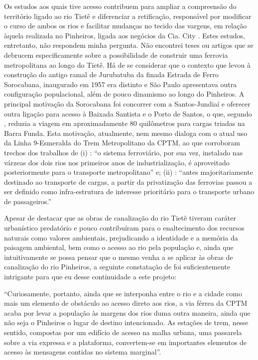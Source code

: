 \documentclass[
	12pt,				%
	openright,			%
	oneside,
	a4paper,			%
	english,			%
	french,				%
	spanish,			%
	brazil,				%
	]{abntex2}
\begin{document}
Os estudos aos quais tive acesso contribuem para ampliar a compreensão do território ligado ao rio Tietê e diferenciar a retificação, responsável por modificar o curso de ambos os rios e facilitar mudanças no tecido das vargens, em relação àquela realizada no Pinheiros, ligada aos negócios da Cia. City \cite[p.53]{francca2000a}. Estes estudos, entretanto, não respondem minha pergunta. Não encontrei teses ou artigos que se debrucem especificamente sobre a possibilidade de construir uma ferrovia metropolitana ao longo do Tietê. Há de se considerar que o contexto que levou à construção do antigo ramal de Jurubatuba da finada Estrada de Ferro Sorocabana, inaugurado em 1957 \cite[p.140]{requena2016a} era distinto e São Paulo apresentava outra configuração populacional, além de pouco dinamismo ao longo do Pinheiros. A principal motivação da Sorocabana foi concorrer com a Santos-Jundiaí e oferecer outra ligação para acesso à Baixada Santista e o Porto de Santos, o que, segundo , reduzia a viagem em aproximadamente 80 quilômetros para cargas triadas na Barra Funda. Esta motivação, atualmente, nem mesmo dialoga com o atual uso da Linha 9-Esmeralda do Trem Metropolitano da CPTM, ao que corroboram trechos dos trabalhos de (i) : ``o sistema ferroviário, por sua vez, instalado nas várzeas dos dois rios nos primeiros anos de industrialização, é aproveitado posteriormente para o transporte metropolitano'' e; (ii) : ``antes majoritariamente destinado ao transporte de cargas, a partir da privatização das ferrovias passou a ser definido como infra-estrutura de interesse prioritário para o transporte urbano de passageiros.'' 

Apesar de  destacar que as obras de canalização do rio Tietê tiveram caráter urbanístico predatório e pouco contribuíram para o enaltecimento dos recursos naturais como valores ambientais, prejudicando a identidade e a memória da paisagem ambiental, bem como o acesso ao rio pela população e, ainda que intuitivamente se possa pensar que o mesmo venha a se aplicar às obras de canalização do rio Pinheiros, a seguinte constatação de  foi suficientemente intrigante para que eu desse continuidade a este projeto:

\begin{citacao}
	``Curiosamente, portanto, ainda que se interponha entre o rio e a cidade como mais um elemento de obstáculo ao acesso direto aos rios, a via férrea da CPTM acaba por levar a população às margens dos rios duma outra maneira, ainda que não seja o Pinheiros o lugar de destino intencionado. As estações de trem, nesse sentido, compostas por um edifício de acesso na malha urbana, uma passarela sobre a via expressa e a plataforma, convertem-se em importantes elementos de acesso às mensagens contidas no sistema marginal''.
\end{citacao}
\end{document}
